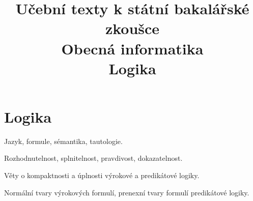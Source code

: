 \clearpage  \clearpage
\title{\LARGE Učební texty k státní bakalářské zkoušce \\ Obecná informatika \\ Logika}

\maketitle
\newpage
\setcounter{section}{0}
\section{Logika}
\begin{pozadavky}
\begin{pitemize}
\item Jazyk, formule, sémantika, tautologie.
\item Rozhodnutelnost, splnitelnost, pravdivost, dokazatelnost.
\item Věty o kompaktnosti a úplnosti výrokové a predikátové logiky.
\item Normální tvary výrokových formulí, prenexní tvary formulí predikátové logiky.
\end{pitemize}
\end{pozadavky}







